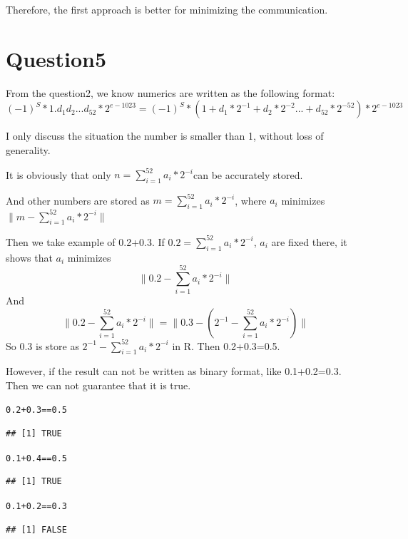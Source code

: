 \documentclass{article}\usepackage[]{graphicx}\usepackage[]{color}
\makeatletter
\newcommand{\hlnum}[1]{\textcolor[rgb]{0.686,0.059,0.569}{#1}}%
\newcommand{\hlopt}[1]{\textcolor[rgb]{0,0,0}{#1}}%
\newenvironment{kframe}{%
 \def\at@end@of@kframe{}%
 \ifinner\ifhmode%
  \def\at@end@of@kframe{\end{minipage}}%
  \begin{minipage}{\columnwidth}%
 \fi\fi%
 \def\FrameCommand##1{\hskip\@totalleftmargin \hskip-\fboxsep
 \colorbox{shadecolor}{##1}\hskip-\fboxsep
     \hskip-\linewidth \hskip-\@totalleftmargin \hskip\columnwidth}%
 \MakeFramed {\advance\hsize-\width
   \@totalleftmargin\z@ \linewidth\hsize
   \@setminipage}}%
 {\par\unskip\endMakeFramed%
 \at@end@of@kframe}
\newenvironment{knitrout}{}{} %
\makeatother
\begin{document}
Therefore, the first approach is better for minimizing the communication.

\section{Question5}


From the question2, we know numerics are written as the following format:
$$(-1)^S*1.d_{1}d_{2}...d_{52}*2^{e-1023}=(-1)^S*(1+d_{1}*2^{-1}+d_{2}*2^{-2}...+d_{52}*2^{-52})*2^{e-1023}$$

I only discuss the situation the number is smaller than 1, without loss of generality. 

It is obviously that only $n=\sum_{i=1}^{52}a_{i}*2^{-i}$can be accurately stored. 

And other numbers are stored as $m=\sum_{i=1}^{52}a_{i}*2^{-i}$, where $a_{i}$ minimizes $\|m-\sum_{i=1}^{52}a_{i}*2^{-i}\|$

Then we take example of 0.2+0.3. If $0.2=\sum_{i=1}^{52}a_{i}*2^{-i}$, $a_{i}$ are fixed there, it shows that $a_{i}$ minimizes
$$\|0.2-\sum_{i=1}^{52}a_{i}*2^{-i}\|$$
And
$$\|0.2-\sum_{i=1}^{52}a_{i}*2^{-i}\|=\|0.3-(2^{-1}-\sum_{i=1}^{52}a_{i}*2^{-i})\|$$
So 0.3 is store as $2^{-1}-\sum_{i=1}^{52}a_{i}*2^{-i}$ in R. Then 0.2+0.3=0.5.

However, if the result can not be written as binary format, like 0.1+0.2=0.3. Then we can not guarantee that it is true.
\begin{knitrout}
\color{fgcolor}\begin{kframe}
\begin{alltt}
\hlnum{0.2}\hlopt{+}\hlnum{0.3}\hlopt{==}\hlnum{0.5}
\end{alltt}
\begin{verbatim}
## [1] TRUE
\end{verbatim}
\begin{alltt}
\hlnum{0.1}\hlopt{+}\hlnum{0.4}\hlopt{==}\hlnum{0.5}
\end{alltt}
\begin{verbatim}
## [1] TRUE
\end{verbatim}
\begin{alltt}
\hlnum{0.1}\hlopt{+}\hlnum{0.2}\hlopt{==}\hlnum{0.3}
\end{alltt}
\begin{verbatim}
## [1] FALSE
\end{verbatim}
\end{kframe}
\end{knitrout}
\end{document}
